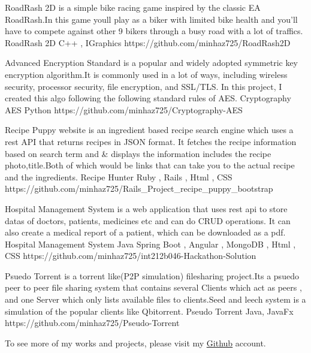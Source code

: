 \documentclass[]{awesome-cv}
\begin{document}
\begin{cventries}
	\cventry
	{RoadRash 2D is a simple bike racing game inspired by the classic EA RoadRash.In this game you\textquotesingle{}ll play as a biker with limited bike health and you'll have to compete against other 9 bikers through a busy road with a lot of traffics.}
	{RoadRash 2D}
	{C++ , IGraphics}
	{https://github.com/minhaz725/RoadRash2D}
	{}
	
	\vspace{-5mm}
	\cventry
	{Advanced Encryption Standard is a popular and widely adopted symmetric key encryption algorithm.It is commonly used in a lot of ways, including wireless security, processor security, file encryption, and SSL/TLS. In this project, I created this algo following the following standard rules of AES.}
	{Cryptography AES}
	{Python}
	{https://github.com/minhaz725/Cryptography-AES}
	{}
	
	\vspace{-5mm}
	\cventry
	{Recipe Puppy website is an ingredient based recipe search engine which uses a rest API that returns recipes in JSON format. It fetches the recipe information based on search term and \& displays the information includes the recipe photo,title.Both of which would be links that can take you to the actual recipe and the ingredients.}
	{Recipe Hunter}
	{Ruby , Rails , Html , CSS}
	{https://github.com/minhaz725/Rails\_Project\_recipe\_puppy\_bootstrap}
	{}
	
	
	\vspace{-5mm}
	\cventry
	{Hospital Management System is a web application that uses rest api to store datas of doctors, patients, medicines etc and can do CRUD operations. It can also create a medical report of a patient, which can be downloaded as a pdf.}
	{Hospital Management System}
	{Java Spring Boot , Angular , MongoDB , Html , CSS}
	{https://github.com/minhaz725/int212b046-Hackathon-Solution}
	{}
	
	\vspace{-5mm}
	\cventry
	{Psuedo Torrent is a torrent like(P2P simulation) filesharing project.It\textquotesingle{}s a psuedo peer to peer file sharing system that contains several \textquotedbl{}Clients\textquotedbl{} which act as peers , and one Server which only lists available files to clients.Seed and leech system is a simulation of the popular clients like Qbitorrent.}
	{Pseudo Torrent}
	{Java, JavaFx}
	{https://github.com/minhaz725/Pseudo-Torrent}
	{}
	
	\vspace{-5mm}
	
	\cventry
	{}
	{To see more of my works and projects, please visit my \href{https://github.com/minhaz725}{\underline{Github}} account. }
	{}
	{}
	{}
	
	\vspace{-5mm}
\end{cventries}

\ 
\end{document}
